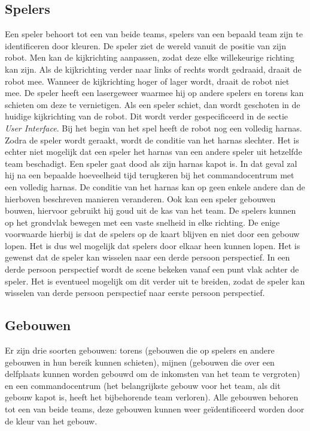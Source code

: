 \subsection{Spelers}
Een speler behoort tot een van beide teams, spelers van een bepaald team zijn te identificeren door kleuren. De speler ziet de wereld vanuit de positie van zijn robot. Men kan de kijkrichting aanpassen, zodat deze elke willekeurige richting kan zijn. Als de kijkrichting verder naar links of rechts wordt gedraaid, draait de robot mee. Wanneer de kijkrichting hoger of lager wordt, draait de robot niet mee. De speler heeft een lasergeweer waarmee hij op andere spelers en torens kan schieten om deze te vernietigen. Als een speler schiet, dan wordt geschoten in de huidige kijkrichting van de robot. Dit wordt verder gespecificeerd in de sectie \emph{User Interface}. Bij het begin van het spel heeft de robot nog een volledig harnas. Zodra de speler wordt geraakt, wordt de conditie van het harnas slechter. Het is echter niet mogelijk dat een speler het harnas van een andere speler uit hetzelfde team beschadigt.
\FloatBarrier
Een speler gaat dood als zijn harnas kapot is. In dat geval zal hij na een bepaalde hoeveelheid tijd terugkeren bij het commandocentrum met een volledig harnas. De conditie van het harnas kan op geen enkele andere dan de hierboven beschreven manieren veranderen. Ook kan een speler gebouwen bouwen, hiervoor gebruikt hij goud uit de kas van het team. De spelers kunnen op het grondvlak bewegen met een vaste snelheid in elke richting. De enige voorwaarde hierbij is dat de spelers op de kaart blijven en niet door een gebouw lopen. Het is dus wel mogelijk dat spelers door elkaar heen kunnen lopen. Het is gewenst dat de speler kan wisselen naar een derde persoon perspectief. In een derde persoon perspectief wordt de scene bekeken vanaf een punt vlak achter de speler.
Het is eventueel mogelijk om dit verder uit te breiden, zodat de speler kan wisselen van derde persoon perspectief naar eerste persoon perspectief.

\subsection{Gebouwen}
Er zijn drie soorten gebouwen: torens (gebouwen die op spelers en andere gebouwen in hun bereik kunnen schieten), mijnen (gebouwen die over een delfplaats kunnen worden gebouwd om de inkomsten van het team te vergroten) en een commandocentrum (het belangrijkste gebouw voor het team, als dit gebouw kapot is, heeft het bijbehorende team verloren). Alle gebouwen behoren tot een van beide teams, deze gebouwen kunnen weer ge\"identificeerd worden door de kleur van het gebouw.


